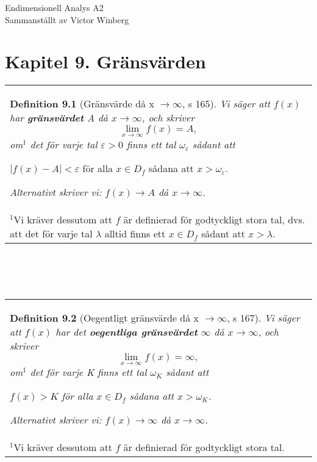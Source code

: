 \documentclass[a4paper]{article}
\begin{document}
\begin{center}
\LARGE Endimensionell Analys A2\\
\large Sammanställt av Victor Winberg\\
\end{center}
\renewcommand{\arraystretch}{1.5}
\section*{Kapitel 9. Gränsvärden}
\begin{tabular}{|L{11.5cm}|} \hline
\textbf{Definition 9.1} (Gränsvärde då x $\rightarrow \infty$, s 165). 
\textit{Vi säger att $f(x)$ har \textbf{gränsvärdet} A då $x \rightarrow \infty$, och skriver}
\begin{displaymath}
\lim_{x\rightarrow \infty} f(x) = A,
\end{displaymath}
\textit{om$^1$ det för varje tal $\varepsilon > 0$ finns ett tal $\omega_\varepsilon$ sådant att}
\begin{center}
$|f(x)-A| < \varepsilon$ \hspace{0.5cm} för alla $x \in D_f$ sådana att $x>\omega_\varepsilon$.
\end{center}
\textit{Alternativt skriver vi: $f(x) \rightarrow A$ då $x \rightarrow \infty$.}
\\
\scriptsize{$^1$Vi kräver dessutom att $f$ är definierad för godtyckligt stora tal, dvs. att det för varje tal $\lambda$ alltid finns ett $x \in D_f$ sådant att $x > \lambda$.}
\\\hline
\end{tabular}
\\\\\\
\begin{tabular}{|L{11.5cm}|} \hline
\textbf{Definition 9.2} (Oegentligt gränsvärde då x $\rightarrow \infty$, s 167).
\textit{Vi säger att $f(x)$ har det \textbf{oegentliga gränsvärdet} $\infty$ då $x \rightarrow \infty$, och skriver} 
\begin{displaymath}
\lim_{x\rightarrow\infty} f(x) = \infty,
\end{displaymath}
\textit{om$^1$ det för varje K finns ett tal $\omega_K$ sådant att}
\begin{center}
$f(x)>K$ \hspace{0.5cm} \textit{för alla $x\in D_f$ sådana att $x>\omega_K$.}
\end{center}
\textit{Alternativt skriver vi: $f(x)\rightarrow\infty$ då $x\rightarrow\infty$.}
\\
\scriptsize{$^1$Vi kräver dessutom att $f$ är definierad för godtyckligt stora tal.}
\\\hline
\end{tabular}
\end{document}
